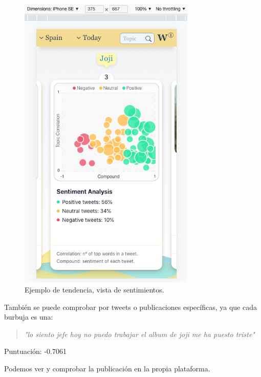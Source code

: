 \begin{figure}[H]
    \centering
    \myfloatalign
    \includegraphics[width=0.75\textwidth]{gfx/ejemplo4.png}
    \caption[Ejemplo de tendencia, vista de sentimientos]{Ejemplo de tendencia, vista de sentimientos.}\label{gfx:ejemplo4}
\end{figure}

También se puede comprobar por tweets o publicaciones específicas, ya que cada burbuja es una:

\vspace{0.3cm}

\begin{quotation}
		\textit{"lo siento jefe hoy no puedo trabajar el album de joji me ha puesto triste"}
\end{quotation}
Puntuación: -0.7061

\vspace{0.4cm}

Podemos ver y comprobar la publicación en la propia plataforma.

